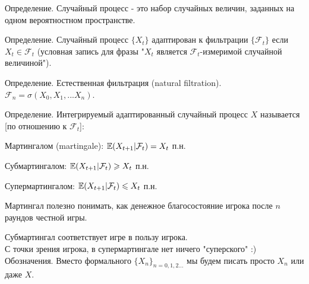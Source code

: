 {%
Определение. Случайный процесс - это набор случайных величин,
заданных на одном вероятностном пространстве. \par
Определение. Случайный процесс $\{ X_{t} \}$ адаптирован к
фильтрации $\{ \mathcal{F}_{t} \}$ если $X_{t} \in
\mathcal{F}_{t}$ (условная запись для фразы "$X_{t}$ является
$\mathcal{F}_{t}$-измеримой случайной величиной"). \par
Определение. Естественная фильтрация (natural filtration).
$\mathcal{F}_{n}=\sigma(X_{0},X_{1},...X_{n})$. \par
Определение. Интегрируемый адаптированный случайный процесс $X$
называется [по отношению к $\mathcal{F}_{t}$]: \par
Мартингалом (martingale): $\mathbb{E}(X_{t+1}|\mathcal{F}_{t})=X_{t}$ п.н. \par
Субмартингалом: $\mathbb{E}(X_{t+1}|\mathcal{F}_{t})\geqslant X_{t}$ п.н. \par
Супермартингалом: $\mathbb{E}(X_{t+1}|\mathcal{F}_{t})\leqslant X_{t}$ п.н. \par

Мартингал полезно понимать, как денежное благосостояние игрока
после $n$ раундов честной игры. \par
Субмартингал соответствует игре в пользу игрока. \\
С точки зрения игрока, в супермартингале нет ничего "суперского"
:) \\



Обозначения. Вместо формального $\{ X_{n} \}_{n=0,1,2...}$ мы
будем писать просто $X_{n}$ или даже $X$. \par

}
